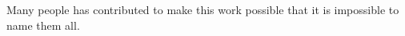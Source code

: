 
Many people has contributed to make this work possible that it is impossible to name them all.





